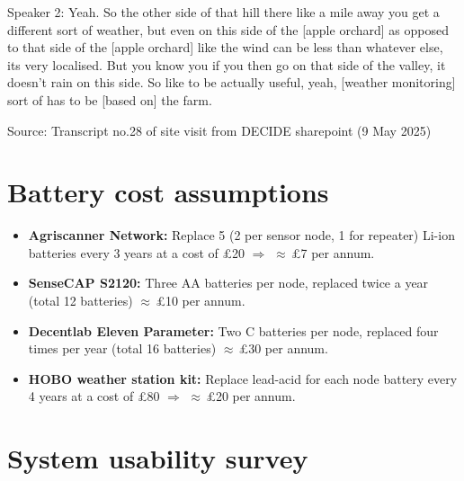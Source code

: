 Speaker 2: Yeah. So the other side of that hill there like a mile away you get a
different sort of weather, but even on this side of the [apple orchard] as
opposed to that side of the [apple orchard] like the wind can be less than
whatever else, its very localised. But you know you if you then go on that side
of the valley, it doesn't rain on this side. So like to be actually useful,
yeah, [weather monitoring] sort of has to be [based on] the farm.

Source: Transcript no.28 of site visit from DECIDE sharepoint (9 May 2025)

\section{Battery cost assumptions}\label{app:battery-assumptions}
\begin{itemize}
  \item \textbf{Agriscanner Network:} Replace 5 (2 per sensor node, 1 for
  repeater) Li-ion batteries every 3 years at a cost of \pounds{}20
  \(\Rightarrow\) \(\approx\)\,\pounds{}7 per annum.
  \item \textbf{SenseCAP S2120:} Three AA batteries per node, replaced twice a
  year (total 12 batteries) \(\approx\)\,\pounds{}10 per annum.
  \item \textbf{Decentlab Eleven Parameter:} Two C batteries per node, replaced
  four times per year (total 16 batteries) \(\approx\)\,\pounds{}30 per annum.
  \item \textbf{HOBO weather station kit:} Replace lead-acid for each node
  battery every 4 years at a cost of \pounds{}80 \(\Rightarrow\)
  \(\approx\)\,\pounds{}20 per annum.
\end{itemize}

\section{System usability survey}\label{app:sus-survey}

